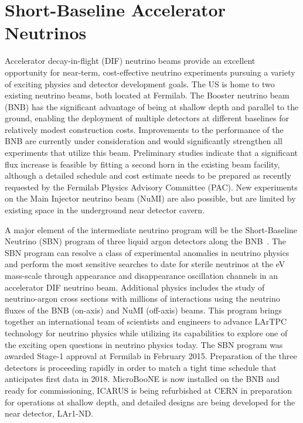 \section{Short-Baseline Accelerator Neutrinos}
\label{sec:AcceleratorSB}

Accelerator decay-in-flight (DIF) neutrino beams provide an excellent
opportunity for near-term, cost-effective neutrino experiments
pursuing a variety of exciting physics and detector development goals.
The US is home to two existing neutrino beams, both located at
Fermilab.  The Booster neutrino beam (BNB) has the significant
advantage of being at shallow depth and parallel to the ground,
enabling the deployment of multiple detectors at different baselines
for relatively modest construction costs.  Improvements to the
performance of the BNB are currently under consideration and would
significantly strengthen all experiments that utilize this beam.
Preliminary studies indicate that a significant flux increase is
feasible by fitting a second horn in the existing beam facility,
although a detailed schedule and cost estimate needs to be prepared as
recently requested by the Fermilab Physics Advisory Committee
(PAC). New experiments on the Main Injector neutrino beam (NuMI) are
also possible, but are limited by existing space in the underground
near detector cavern.

A major element of the intermediate neutrino program will be the
Short-Baseline Neutrino (SBN) program of three liquid argon detectors
along the BNB~\cite{SBNProposal}.  The SBN program can resolve a class
of experimental anomalies in neutrino physics and perform the most
sensitive searches to date for sterile neutrinos at the eV mass-scale
through appearance and disappearance oscillation channels in an
accelerator DIF neutrino beam.  Additional physics includes the study
of neutrino-argon cross sections with millions of interactions using
the neutrino fluxes of the BNB (on-axis) and NuMI (off-axis) beams.
This program brings together an international team of scientists and
engineers to advance LArTPC technology for neutrino physics while
utilizing its capabilities to explore one of the exciting open
questions in neutrino physics today.  The SBN program was awarded
Stage-1 approval at Fermilab in February 2015.  Preparation of the
three detectors is proceeding rapidly in order to match a tight time
schedule that anticipates first data in 2018.  MicroBooNE is now
installed on the BNB and ready for commissioning, ICARUS is being
refurbished at CERN in preparation for operations at shallow depth,
and detailed designs are being developed for the near detector,
LAr1-ND.

